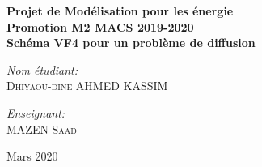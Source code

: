 \documentclass[11pt,a4paper]{scrartcl}%
\theoremstyle{plain}
\theoremstyle{definition}
\theoremstyle{remark}
\begin{document}
	
 \begin{titlepage}
	\hspace*{-10mm}
	
	
	
	\vspace*{20mm}
	\begin{center}
		
		\textbf{\LARGE Projet de Modélisation pour les énergie\\ Promotion M2 MACS 2019-2020}\\ [2cm]
		{\huge \bfseries  Schéma VF4 pour un problème de diffusion \\ [0.4cm] }
		\vspace*{+40mm}
		\begin{minipage}{0.4\textwidth}
			\begin{flushleft} \large
				\emph{Nom étudiant:}\\ \textsc{Dhiyaou-dine AHMED KASSIM} 
			\end{flushleft}
		\end{minipage}
		\hspace*{+26mm} \vspace*{+40mm}
		\begin{minipage}{0.4\textwidth}
			\begin{flushleft} \large
				\emph{Enseignant:}\\ \textsc{MAZEN Saad}
			\end{flushleft}
		\end{minipage}
		\vfill
		{\large   Mars 2020}
	\end{center}
\end{titlepage}
	
\end{document}
